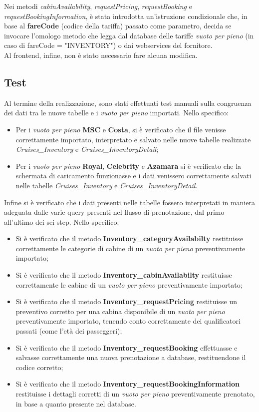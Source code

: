 Nei metodi \textit{cabinAvailability}, \textit{requestPricing}, \textit{requestBooking} e \textit{requestBookingInformation}, è stata introdotta un'istruzione condizionale che, in base al \textbf{fareCode} (codice della tariffa) passato come parametro, decida se invocare l'omologo metodo che legga dal database delle tariffe \textit{vuoto per pieno} (in caso di fareCode = "INVENTORY") o dai \glspl{webservice} del fornitore.\\
Al frontend, infine, non è stato necessario fare alcuna modifica.
\subsection{Test}
Al termine della realizzazione, sono stati effettuati test manuali sulla congruenza dei dati tra le nuove tabelle e i \textit{vuoto per pieno} importati. Nello specifico:
\begin{itemize}
	\item Per i \textit{vuoto per pieno} \textbf{MSC} e \textbf{Costa}, si è verificato che il file venisse correttamente importato, interpretato e salvato nelle nuove tabelle realizzate \textit{Cruises\_Inventory} e \textit{Cruises\_InventoryDetail};
	\item Per i \textit{vuoto per pieno} \textbf{Royal}, \textbf{Celebrity} e \textbf{Azamara} si è verificato che la schermata di caricamento funzionasse e i dati venissero correttamente salvati nelle tabelle \textit{Cruises\_Inventory} e \textit{Cruises\_InventoryDetail}.
\end{itemize} 
Infine si è verificato che i dati presenti nelle tabelle fossero interpretati in maniera adeguata dalle varie query presenti nel flusso di prenotazione, dal primo all'ultimo dei sei step. Nello specifico: 
\begin{itemize}
	\item Si è verificato che il metodo \textbf{Inventory\_categoryAvailabilty} restituisse correttamente le categorie di cabine di un \textit{vuoto per pieno} preventivamente importato;
	\item Si è verificato che il metodo \textbf{Inventory\_cabinAvailabilty} restituisse correttamente le cabine di un \textit{vuoto per pieno} preventivamente importato;
	\item Si è verificato che il metodo \textbf{Inventory\_requestPricing} restituisse un preventivo corretto per una cabina disponibile di un \textit{vuoto per pieno} preventivamente importato, tenendo conto correttamente dei qualificatori passati (come l'età dei passeggeri);
	\item Si è verificato che il metodo \textbf{Inventory\_requestBooking} effettuasse e salvasse correttamente una nuova prenotazione a database, restituendone il codice corretto;
	\item Si è verificato che il metodo \textbf{Inventory\_requestBookingInformation} restituisse i dettagli corretti di un \textit{vuoto per pieno} preventivamente prenotato, in base a quanto presente nel database.
\end{itemize}
\newpage
